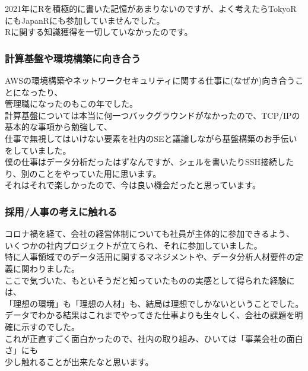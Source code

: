 \documentclass[
  letterpaper,
  DIV=11,
  numbers=noendperiod]{scrartcl}
\begin{document}
2021年にRを積極的に書いた記憶があまりないのですが、よく考えたらTokyoRにもJapanRにも参加していませんでした。\\
Rに関する知識獲得を一切していなかったのです。

\hypertarget{ux8a08ux7b97ux57faux76e4ux3084ux74b0ux5883ux69cbux7bc9ux306bux5411ux304dux5408ux3046}{%
\subsubsection{計算基盤や環境構築に向き合う}\label{ux8a08ux7b97ux57faux76e4ux3084ux74b0ux5883ux69cbux7bc9ux306bux5411ux304dux5408ux3046}}

AWSの環境構築やネットワークセキュリティに関する仕事に(なぜか)向き合うことになったり、\\
管理職になったのもこの年でした。\\
計算基盤については本当に何一つバックグラウンドがなかったので、TCP/IPの基本的な事項から勉強して、\\
仕事で無視してはいけない要素を社内のSEと議論しながら基盤構築のお手伝いをしていました。\\
僕の仕事はデータ分析だったはずなんですが、シェルを書いたりSSH接続したり、別のことをやっていた用に思います。\\
それはそれで楽しかったので、今は良い機会だったと思っています。

\hypertarget{ux63a1ux7528ux4ebaux4e8bux306eux8003ux3048ux306bux89e6ux308cux308b}{%
\subsubsection{採用/人事の考えに触れる}\label{ux63a1ux7528ux4ebaux4e8bux306eux8003ux3048ux306bux89e6ux308cux308b}}

コロナ禍を経て、会社の経営体制についても社員が主体的に参加できるよう、\\
いくつかの社内プロジェクトが立てられ、それに参加していました。\\
特に人事領域でのデータ活用に関するマネジメントや、データ分析人材要件の定義に関わりました。\\
ここで気づいた、もといそうだと知っていたものの実感として得られた経験には、\\
「理想の環境」も「理想の人材」も、結局は理想でしかないということでした。\\
データでわかる結果はこれまでやってきた仕事よりも生々しく、会社の課題を明確に示すのでした。\\
これが正直すごく面白かったので、社内の取り組み、ひいては「事業会社の面白さ」にも\\
少し触れることが出来たなと思います。
\end{document}
